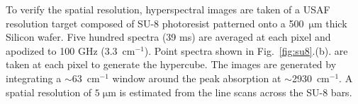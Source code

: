 \documentclass{optica-article}
\begin{document}

To verify the spatial resolution, hyperspectral images are taken of a USAF resolution target composed of SU-8 photoresist patterned onto a \mbox{500 $\mathrm{\mu m}$} thick Silicon wafer. Five hundred spectra (39 ms) are averaged at each pixel and apodized to 100 GHz (\mbox{3.3 $\mathrm{cm^{-1}}$}). Point spectra shown in \mbox{Fig. \ref{fig:su8}.(b).} are taken at each pixel to generate the hypercube. The images are generated by integrating a \mbox{$\sim$63 $\mathrm{cm^{-1}}$} window around the peak absorption at \mbox{$\sim$2930 $\mathrm{cm^{-1}}$}. A spatial resolution of \mbox{$5 \; \mathrm{\mu m}$} is estimated from the line scans across the SU-8 bars.

\end{document}
